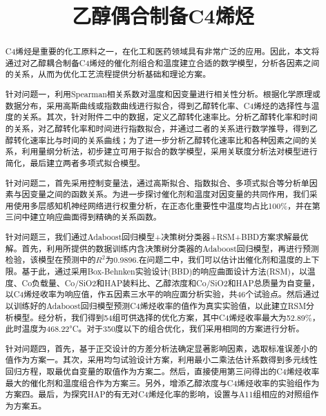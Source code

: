 \documentclass[withoutpreface,bwprint]{cumcmthesis} %
\title{乙醇偶合制备C4烯烃}
\begin{document}
\maketitle
\begin{abstract}
C4烯烃是重要的化工原料之一，在化工和医药领域具有非常广泛的应用。因此，本文将通过对乙醇耦合制备C4烯烃的催化剂组合和温度建立合适的数学模型，分析各因素之间的关系，从而为优化工艺流程提供分析基础和理论方案。

针对问题一，利用Spearman相关系数对温度和因变量进行相关性分析。根据化学原理或数据分布，采用高斯曲线或指数曲线进行拟合，得到乙醇转化率、C4烯烃的选择性与温度的关系。其次，针对附件二中的数据，定义乙醇转化速率比。分析乙醇转化率和时间的关系，对乙醇转化率和时间进行指数拟合，并通过二者的关系进行数学推导，得到乙醇转化速率比与时间的关系曲线；为了进一步分析乙醇转化速率比和各种因素之间的关系，利用量纲分析法，初步建立可用于拟合的数学模型，采用关联度分析法对模型进行简化，最后建立两者多项式拟合模型。

针对问题二，首先采用控制变量法，通过高斯拟合、指数拟合、多项式拟合等分析单因素与因变量之间的函数关系。为进一步探讨催化剂和温度对因变量的共同作用，我们采用使用多层感知机神经网络进行权重分析，在正态化重要性中温度均占比100\%，并在第三问中建立响应曲面得到精确的关系函数。

针对问题三，我们通过Adaboost回归模型+决策树分类器+RSM+BBD方案求解最优解。首先，利用所提供的数据训练内含决策树分类器的Adaboost回归模型，再进行预测检验，该模型在预测中的$R^2$为0.9896.在问题二中，我们可以估计出催化剂和温度的上下限。基于此，通过采用Box-Behnken实验设计(BBD)的响应曲面设计方法(RSM)，以温度、Co负载量、Co/SiO2和HAP装料比、乙醇浓度和Co/SiO2和HAP总质量为自变量，以C4烯烃收率为响应值，作五因素三水平的响应面分析实验，共46个试验点。然后通过以训练好的Adaboost回归模型预测C4烯烃收率的值作为真实实验值，以此建立RSM分析模型。经分析，我们得到54组可供选择的优化方案，其中C4烯烃收率最大为52.89\%，此时温度为468.22°C。对于350度以下的组合优化，我们采用相同的方案进行分析。

针对问题四，首先，基于正交设计的方差分析法确定显著影响因素，选取标准误差小的值作为方案一。其次，采用均匀试验设计方案，利用最小二乘法估计系数得到多元线性回归方程，取最优自变量的取值作为方案二。然后，直接使用第三问得出的C4烯烃收率最大的催化剂和温度组合作为方案三。另外，增添乙醇浓度与C4烯烃收率的实验组作为方案四。最后，为探究HAP的有无对C4烯烃化率的影响，设置与A11组相应的对照组作为方案五。

\end{abstract}
\end{document}
